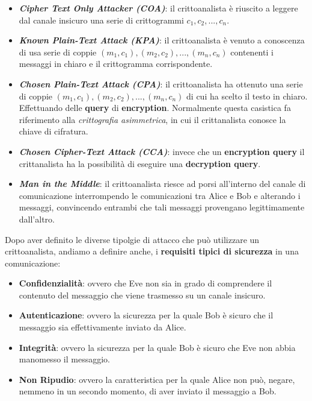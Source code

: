 \begin{itemize}
    \item \textbf{\textit{Cipher Text Only Attacker (COA)}}: il crittoanalista è riuscito a leggere dal canale insicuro una serie di crittogrammi $c_1, c_2, ..., c_n$.
    \item \textbf{\textit{Known Plain-Text Attack (KPA)}}: il crittoanalista è venuto a conoscenza di usa serie di coppie $(m_1, c_1), (m_2, c_2), ..., (m_n, c_n)$ contenenti i messaggi in chiaro e il crittogramma corrispondente.
    \item \textbf{\textit{Chosen Plain-Text Attack (CPA)}}: il crittoanalista ha ottenuto una serie di coppie $(m_1, c_1), (m_2, c_2), ..., (m_n, c_n)$ di cui ha scelto il testo in chiaro. Effettuando delle \textbf{query} di \textbf{encryption}. Normalmente questa casistica fa riferimento alla \textit{crittografia asimmetrica}, in cui il crittanalista conosce la chiave di cifratura.
    \item \textbf{\textit{Chosen Cipher-Text Attack (CCA)}}: invece che un \textbf{encryption query} il crittanalista ha la possibilità di eseguire una \textbf{decryption query}.
    \item \textbf{\textit{Man in the Middle}}: il crittoanalista riesce ad porsi all'interno del canale di comunicazione interrompendo le comunicazioni tra Alice e Bob e alterando i messaggi, convincendo entrambi che tali messaggi provengano legittimamente dall'altro. 
\end{itemize}
Dopo aver definito le diverse tipolgie di attacco che può utilizzare un crittoanalista, andiamo a definire anche, i \textbf{requisiti tipici di sicurezza} in una comunicazione:
\begin{itemize}
    \item \textbf{Confidenzialità}: ovvero che Eve non sia in grado di comprendere il contenuto del messaggio che viene trasmesso su un canale insicuro.
    \item \textbf{Autenticazione}: ovvero la sicurezza per la quale Bob è sicuro che il messaggio sia effettivamente inviato da Alice.
    \item \textbf{Integrità}: ovvero la sicurezza per la quale Bob è sicuro che Eve non abbia manomesso il messaggio.
    \item \textbf{Non Ripudio}: ovvero la caratteristica per la quale Alice non può, negare, nemmeno in un secondo momento, di aver inviato il messaggio a Bob.
\end{itemize}

